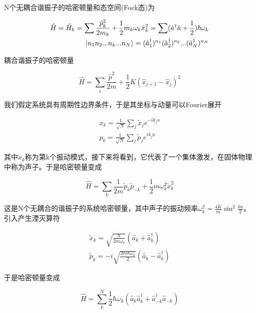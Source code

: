 N个无耦合谐振子的哈密顿量和态空间(Fock态)为

\begin{equation}
    \begin{split}
        \hat{H} = \hat{H}_k = \sum\frac{\hat{p}^2_k}{2m_k}+\frac{1}{2}m_k\omega_k\hat{x}_k^2 = \sum(\hat{a}^\dagger\hat{a}+\frac{1}{2})\hbar\omega_k \\
        \ket{n_1n_2...n_k...n_N}=(\hat{a}_1^\dagger)^{n_1}(\hat{a}_2^\dagger)^{n_2}...(\hat{a}_N^\dagger)^{n_N}
    \end{split}
\end{equation}

耦合谐振子的哈密顿量

\begin{equation}
	\hat{H}=\sum_{i}\frac{\hat{p}^2}{2m}+\frac{1}{2}K(\hat{x}_{j+1}-\hat{x}_j)^2
\end{equation}

我们假定系统具有周期性边界条件，于是其坐标与动量可以Fourier展开

\begin{equation}
	\begin{array}{lr}
		x_k=\frac{1}{\sqrt{N}}\sum_{j}\tilde{x}_je^{-ik_ja} \\
		p_k=\frac{1}{\sqrt{N}}\sum_{j}\tilde{p}_je^{ik_ja}
	\end{array}
\end{equation}

其中$\tilde{x}_k$称为第k个振动模式，接下来将看到，它代表了一个集体激发，在固体物理中称为声子。于是哈密顿量变成

\begin{equation}
	\hat{H}=\sum_{k}\frac{1}{2m}\tilde{p}_k\tilde{p}_{-k}+\frac{1}{2}m\omega_k^2\tilde{x}_k^2
\end{equation}

这是N个无耦合的谐振子的系统哈密顿量，其中声子的振动频率$\omega_k^2=\frac{4K}{m}\sin^2\frac{ka}{2}$。引入产生湮灭算符

\begin{equation}
	\begin{array}{lr}
		\tilde{x}_k=\sqrt{\frac{\hbar}{2m\omega_k}}(\hat{a}_k+\hat{a}_k^\dagger) \\
		\tilde{p}_k=-i\sqrt{\frac{2m\hbar\omega_k}{2}}(\hat{a}_k-\hat{a}_k^\dagger)
	\end{array}
\end{equation}

于是哈密顿量变成

\begin{equation}
	\hat{H}=\sum_{k}^N\frac{1}{2}\hbar\omega_k(\hat{a}_k\hat{a}_k^\dagger+\hat{a}_{-k}^\dagger\hat{a}_{-k})
\end{equation}

